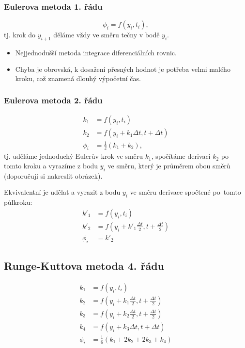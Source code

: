 \documentclass[a4paper,11pt,twoside]{article}
\begin{document}
    \subsubsection{Eulerova metoda 1. řádu}
        \begin{equation}\label{eq:Euler1}
            \phi_{i}=f(y_{i},t_{i}),
        \end{equation}
        tj. krok do $y_{i+1}$ děláme vždy ve směru tečny v bodě $y_{i}$.

        \begin{itemize}
            \item Nejjednodušší metoda integrace diferenciálních rovnic.
            \item Chyba je obrovská, k dosažení přesných hodnot je potřeba velmi malého kroku, což znamená dlouhý výpočetní čas.
        \end{itemize}

    \subsubsection{Eulerova metoda 2. řádu}
        \begin{align}\label{eq:Euler2a}
            k_{1}&=f(y_{i},t_{i})\nonumber\\
            k_{2}&=f\left(y_{i}+k_{1}\Delta t,t+\Delta t\right)\\
            \phi_{i}&=\frac{1}{2}\left(k_{1}+k_{2}\right),\nonumber
        \end{align}
        tj. uděláme jednoduchý Eulerův krok ve směru $k_{1}$, spočítáme derivaci $k_{2}$ po tomto kroku a vyrazíme z bodu $y_{i}$ ve směru, který je průměrem obou směrů (doporučuji si nakreslit obrázek).

        Ekvivalentní je udělat  a vyrazit z bodu $y_{i}$ ve směru derivace spočtené po~tomto půlkroku:
        \begin{align}\label{eq:Euler2b}
            k'_{1}&=f(y_{i},t_{i})\nonumber\\
            k'_{2}&=f\left(y_{i}+k'_{1}\frac{\Delta t}{2},t+\frac{\Delta t}{2}\right)\\
            \phi_{i}&=k'_{2}\nonumber
        \end{align}

    \subsection{Runge-Kuttova metoda 4. řádu}
        \begin{align}\label{eq:RungeKutta}
            k_{1}&=f(y_{i},t_{i})\nonumber\\
            k_{2}&=f\left(y_{i}+k_{1}\frac{\Delta t}{2},t+\frac{\Delta t}{2}\right)\nonumber\\
            k_{3}&=f\left(y_{i}+k_{2}\frac{\Delta t}{2},t+\frac{\Delta t}{2}\right)\\
            k_{4}&=f\left(y_{i}+k_{3}\Delta t,t+\Delta t\right)\nonumber\\
            \phi_{i}&=\frac{1}{6}\left(k_{1}+2k_{2}+2k_{3}+k_{4}\right)\nonumber
        \end{align}
        
\end{document}
